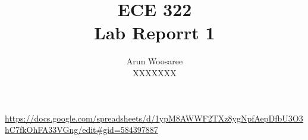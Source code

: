 \documentclass[letterpaper]{article}
\title{ECE 322 \\
Lab Reporrt 1}
\author{Arun Woosaree\\
XXXXXXX}
\begin{document}
 \maketitle 

\section{}
\url{https://docs.google.com/spreadsheets/d/1ypM8AWWF2TXz8ygNpfAepDfbU3O3hC7fkOhFA33VGng/edit#gid=584397887}
\end{document}
